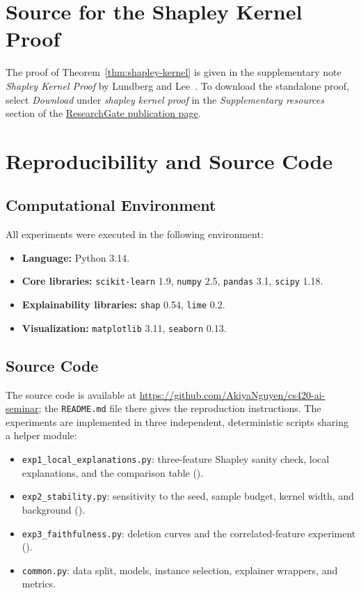 \section{Source for the Shapley Kernel Proof}
\label{app:shapley-kernel-proof}

The proof of Theorem~\ref{thm:shapley-kernel} is given in the supplementary note \emph{Shapley Kernel Proof} by Lundberg and Lee~\cite{NIPS2017_8a20a862}. To download the standalone proof, select \emph{Download} under \emph{shapley kernel proof} in the \emph{Supplementary resources} section of the \href{https://www.researchgate.net/publication/317062430_A_Unified_Approach_to_Interpreting_Model_Predictions}{ResearchGate publication page}.

\section{Reproducibility and Source Code}
\label{sec:appendix-code}

\subsection{Computational Environment}
\label{sec:env-specs}
All experiments were executed in the following environment:
\begin{itemize}[leftmargin=1.2em, itemsep=1.5pt]
    \item \textbf{Language:} Python 3.14.
    \item \textbf{Core libraries:} \texttt{scikit-learn} 1.9, \texttt{numpy} 2.5, \texttt{pandas} 3.1, \texttt{scipy} 1.18.
    \item \textbf{Explainability libraries:} \texttt{shap} 0.54, \texttt{lime} 0.2.
    \item \textbf{Visualization:} \texttt{matplotlib} 3.11, \texttt{seaborn} 0.13.
\end{itemize}

\subsection{Source Code}
\label{sec:source-code}
The source code is available at \url{https://github.com/AkiyaNguyen/cs420-ai-seminar}; the \texttt{README.md} file there gives the reproduction instructions. The experiments are implemented in three independent, deterministic scripts sharing a helper module:
\begin{itemize}[leftmargin=1.2em, itemsep=1.5pt]
    \item \texttt{exp1\_local\_explanations.py}: three-feature Shapley sanity check, local explanations, and the comparison table ().
    \item \texttt{exp2\_stability.py}: sensitivity to the seed, sample budget, kernel width, and background ().
    \item \texttt{exp3\_faithfulness.py}: deletion curves and the correlated-feature experiment ().
    \item \texttt{common.py}: data split, models, instance selection, explainer wrappers, and metrics.
\end{itemize}


